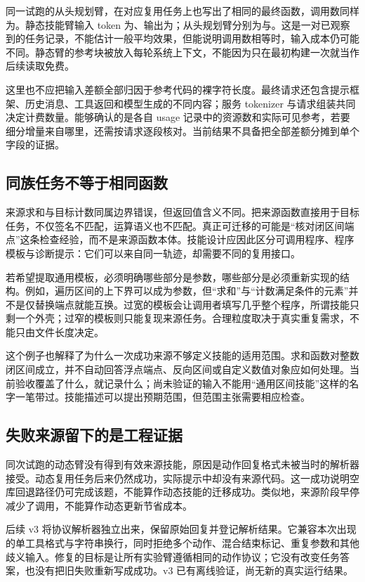 同一试跑的从头规划臂，在对应复用任务上也写出了相同的最终函数，调用数同样为。静态技能臂输入 token 为、输出为；从头规划臂分别为与。这是一对已观察到的任务记录，不能估计一般平均效果，但能说明调用数相等时，输入成本仍可能不同。静态臂的参考块被放入每轮系统上下文，不能因为只在最初构建一次就当作后续读取免费。

这里也不应把输入差额全部归因于参考代码的裸字符长度。最终请求还包含提示框架、历史消息、工具返回和模型生成的不同内容；服务 tokenizer 与请求组装共同决定计费数量。能够确认的是各自 usage 记录中的资源数和实际可见参考，若要细分增量来自哪里，还需按请求逐段核对。当前结果不具备把全部差额分摊到单个字段的证据。

\subsection{同族任务不等于相同函数}

来源求和与目标计数同属边界错误，但返回值含义不同。把来源函数直接用于目标任务，不仅签名不匹配，运算语义也不匹配。真正可迁移的可能是“核对闭区间端点”这条检查经验，而不是来源函数本体。技能设计应因此区分可调用程序、程序模板与诊断提示：它们可以来自同一轨迹，却需要不同的复用接口。

若希望提取通用模板，必须明确哪些部分是参数，哪些部分是必须重新实现的结构。例如，遍历区间的上下界可以成为参数，但“求和”与“计数满足条件的元素”并不是仅替换端点就能互换。过宽的模板会让调用者填写几乎整个程序，所谓技能只剩一个外壳；过窄的模板则只能复现来源任务。合理粒度取决于真实重复需求，不能只由文件长度决定。

这个例子也解释了为什么一次成功来源不够定义技能的适用范围。求和函数对整数闭区间成立，并不自动回答浮点端点、反向区间或自定义数值对象应如何处理。当前验收覆盖了什么，就记录什么；尚未验证的输入不能用“通用区间技能”这样的名字一笔带过。技能描述可以提出预期范围，但范围主张需要相应检查。

\subsection{失败来源留下的是工程证据}

同次试跑的动态臂没有得到有效来源技能，原因是动作回复格式未被当时的解析器接受。动态复用任务后来仍然成功，实际提示中却没有来源代码。这一成功说明空库回退路径仍可完成该题，不能算作动态技能的迁移成功。类似地，来源阶段早停减少了调用，不能算作动态更新节省成本。

后续 v3 将协议解析器独立出来，保留原始回复并登记解析结果。它兼容本次出现的单工具格式与字符串换行，同时拒绝多个动作、混合结束标记、重复参数和其他歧义输入。修复的目标是让所有实验臂遵循相同的动作协议；它没有改变任务答案，也没有把旧失败重新写成成功。v3 已有离线验证，尚无新的真实运行结果。

